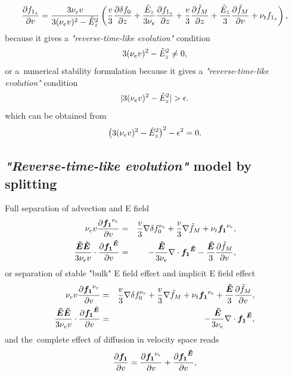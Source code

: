 \documentclass[preprint,12pt]{elsarticle}
\newcounter{bla}
\begin{document}
\begin{equation}
  \frac{\partial{f_{1_z}}}{\partial{v}} = 
  \frac{3 \nu_{e}v}{3 (\nu_{e}v)^2 - \tilde{E}_z^2}
  \left(
  \frac{v}{3}\frac{\partial{\delta f_0}}{\partial{z}} + \frac{\tilde{E}_z}{3 \nu_{e}}\frac{\partial{f_{1_z}}}{\partial{z}}
  + \frac{v}{3}\frac{\partial{\tilde{f}_M}}{\partial{z}} + \frac{\tilde{E}_z}{3}\frac{\partial{\tilde{f}_M}}{\partial{v}} 
  + \nu_{t}f_{1_z}\right) ,
  \label{eq:OOE_P1AWBS_model_1Danalysis}
\end{equation}
because it gives a \textit{"reverse-time-like evolution"} condition
\begin{equation}
  3(\nu_{e}v)^2 - \tilde{E}_z^2 \neq 0 ,
  \nonumber
\end{equation}
or a~numerical stability formulation
because it gives a \textit{"reverse-time-like evolution"} condition
\begin{equation}
  |3(\nu_{e}v)^2 - \tilde{E}_z^2| > \epsilon .
  \label{eq:OOE_reverse_time_condition}
\end{equation}
which can be obtained from
\begin{equation}
  \left(3(\nu_{e}v)^2 - \tilde{E}_z^2\right)^2 - \epsilon^2 = 0 .
  \label{eq:OOE_reverse_time_condition}
\end{equation}

\subsection{\textit{"Reverse-time-like evolution"} model by splitting}
\label{sec:OOE_stable_splitting}
Full separation of advection and E field
\begin{eqnarray}
  \nu_{e}v \frac{\partial{\boldsymbol{f_1}^{\nu_{e}}}}{\partial{v}} &=& 
  \frac{v}{3}\nabla\delta f_0^{\nu_{e}}
  + \frac{v}{3}\nabla\tilde{f}_M + \nu_{t}\boldsymbol{f_1}^{\nu_{e}} ,
  \nonumber \\
  \frac{\boldsymbol{\tilde{E}}\boldsymbol{\tilde{E}}}{3 \nu_{e}v}\cdot
  \frac{\partial{\boldsymbol{f_1}^{\boldsymbol{\tilde{E}}}}}{\partial{v}} &=& -\frac{\boldsymbol{\tilde{E}}}{3 \nu_{e}}\nabla\cdot\boldsymbol{f_1}^{\boldsymbol{\tilde{E}}} 
  - \frac{\boldsymbol{\tilde{E}}}{3}\frac{\partial{\tilde{f}_M}}{\partial{v}},
  \nonumber
\end{eqnarray}
or separation of stable "bulk" E field effect and implicit E field effect
\begin{eqnarray}
  \nu_{e}v \frac{\partial{\boldsymbol{f_1}^{\nu_{e}}}}{\partial{v}} &=& 
  \frac{v}{3}\nabla\delta f_0^{\nu_{e}}
  + \frac{v}{3}\nabla\tilde{f}_M + \nu_{t}\boldsymbol{f_1}^{\nu_{e}} 
  + \frac{\boldsymbol{\tilde{E}}}{3}\frac{\partial{\tilde{f}_M}}{\partial{v}},
  \nonumber \\
  \frac{\boldsymbol{\tilde{E}}\boldsymbol{\tilde{E}}}{3 \nu_{e}v}\cdot
  \frac{\partial{\boldsymbol{f_1}^{\boldsymbol{\tilde{E}}}}}{\partial{v}} &=& -\frac{\boldsymbol{\tilde{E}}}{3 \nu_{e}}\nabla\cdot\boldsymbol{f_1}^{\boldsymbol{\tilde{E}}} ,
  \nonumber
\end{eqnarray}
and the~complete effect of diffusion in velocity space reads
\begin{equation}
  \frac{\partial{\boldsymbol{f_1}}}{\partial{v}} = \frac{\partial{\boldsymbol{f_1}^{\nu_{e}}}}{\partial{v}} + \frac{\partial{\boldsymbol{f_1}^{\boldsymbol{\tilde{E}}}}}{\partial{v}} ,
  \nonumber
\end{equation}
\end{document}
